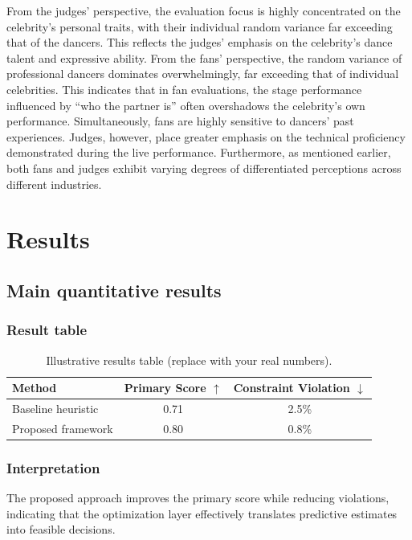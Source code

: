 \documentclass[12pt]{article}
\begin{document}
\noindent From the judges' perspective, the evaluation focus is highly concentrated on the celebrity's personal traits, with their individual random variance far exceeding that of the dancers. This reflects the judges' emphasis on the celebrity's dance talent and expressive ability. From the fans' perspective, the random variance of professional dancers dominates overwhelmingly, far exceeding that of individual celebrities. This indicates that in fan evaluations, the stage performance influenced by ``who the partner is'' often overshadows the celebrity's own performance. Simultaneously, fans are highly sensitive to dancers' past experiences. Judges, however, place greater emphasis on the technical proficiency demonstrated during the live performance. Furthermore, as mentioned earlier, both fans and judges exhibit varying degrees of differentiated perceptions across different industries.

\section{Results}
\subsection{Main quantitative results}
\subsubsection{Result table}
\begin{table}[H]
  \centering
  \caption{Illustrative results table (replace with your real numbers).}
  \label{tab:results}
  \begin{tabular}{lcc}
    \toprule
    Method & Primary Score $\uparrow$ & Constraint Violation $\downarrow$ \\
    \midrule
    Baseline heuristic & 0.71 & 2.5\% \\
    Proposed framework & 0.80 & 0.8\% \\
    \bottomrule
  \end{tabular}
\end{table}

\subsubsection{Interpretation}
The proposed approach improves the primary score while reducing violations, indicating that the optimization layer effectively
translates predictive estimates into feasible decisions.
\end{document}
